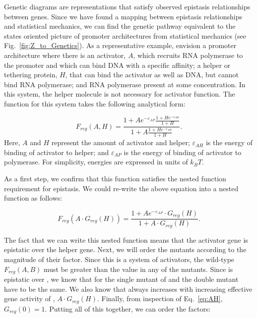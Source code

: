 Genetic diagrams are representations that satisfy observed epistasis
relationships between genes. Since we have found a mapping between epistasis
relationships and statistical mechanics, we can find the genetic pathway
equivalent to the states oriented picture of promoter architectures from
statistical mechanics (see Fig.~\ref{fig:Z_to_Genetics}). As a representative
example, envision a promoter architecture where there is an activator, \(A\),
which recruits RNA polymerase to the promoter and which can bind DNA with a
specific affinity; a helper or tethering protein, \(H\), that can bind the
activator as well as DNA, but cannot bind RNA polymerase; and RNA polymerase
present at some concentration. In this system, the helper molecule is not
necessary for activator function. The \Freg{} function for this system takes
the following analytical form:

\begin{equation}
    F_{reg}(A, H) = \frac{1 + A e^{-\varepsilon _{AP}}\frac{1 + H e^{-\varepsilon _{AH}}}
                                                       {1 + H}
                          }
                          {1 + A\frac{1 + H e^{-\varepsilon _{AH}}}
                                     {1 + H} }.
\label{eq:AH}
\end{equation}
Here, \(A\) and \(H\) represent the amount of activator and helper; \(\varepsilon _{AH}\)
is the energy of binding of activator to helper; and \(\varepsilon _{AP}\) is the
energy of binding of activator to polymerase. For simplicity, energies are
expressed in units of \(k_B T\).

As a first step, we confirm that this function satisfies the nested function
requirement for epistasis. We could re-write the above equation into a nested
function as follows:

\begin{equation}
    F_{reg}(A\cdot G_{reg}(H)) = \frac{1 + A e^{-\varepsilon _{AP}} \cdot G_{reg}(H)}
                                 {1 + A\cdot G_{reg}(H)}.
\label{eq:AHsimp}
\end{equation}

The fact that we can write this nested function means that the activator gene
is epistatic over the helper gene. Next, we will order the mutants according to
the magnitude of their \Freg{} factor. Since this is a system of activators,
the wild-type \(F_{reg}(A, B)\) must be greater than the value in any of the
mutants. Since  is epistatic over , we know that \Freg{} for
the single mutant of  and the double mutant have to be the same.
We also know that \Freg{} always increases with increasing effective gene
activity of , \(A\cdot G_{reg}(H)\). Finally, from inspection of
Eq.~\ref{eq:AH}, \(G_{reg}(0) = 1\). Putting all of this together, we can order
the factors:

